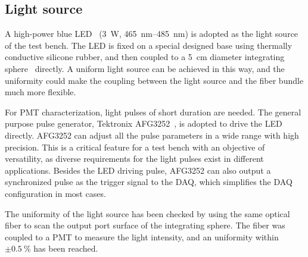 \documentclass{JINST}
\begin{document}
\subsection{Light source}
\label{sec:light_source}
	
A high-power blue LED~\cite{z-light} (\SI{3}{\watt},  \SIrange{465}{485}{\nano\meter}) is adopted as the light source of the test bench.
The LED is fixed on a special designed base using thermally conductive silicone rubber, and then coupled to a  \SI{5}{\centi\meter} diameter integrating sphere~\cite{integrating_sphere} directly.
A uniform light source can be achieved in this way, and the uniformity could make the coupling between the light source and the fiber bundle much more flexible.
	
For PMT characterization, light pulses of short duration are needed.
The general purpose pulse generator, Tektronix AFG3252~\cite{afg3252}, is adopted to drive the LED directly.
AFG3252 can adjust all the pulse parameters in a wide range with high precision. This is a critical feature for a test bench with an objective of versatility, as diverse requirements for the light pulses exist in different applications. 
Besides the LED driving pulse, AFG3252 can also output a synchronized pulse as the trigger signal to the DAQ, which  simplifies the DAQ configuration in most cases. 
	
The uniformity of the light source has been checked by using the same optical fiber to scan the output port surface of the integrating sphere. The fiber was coupled to a PMT to measure the light intensity, and an uniformity within $\pm\SI{0.5}{\percent}$ has been reached.
\end{document}

